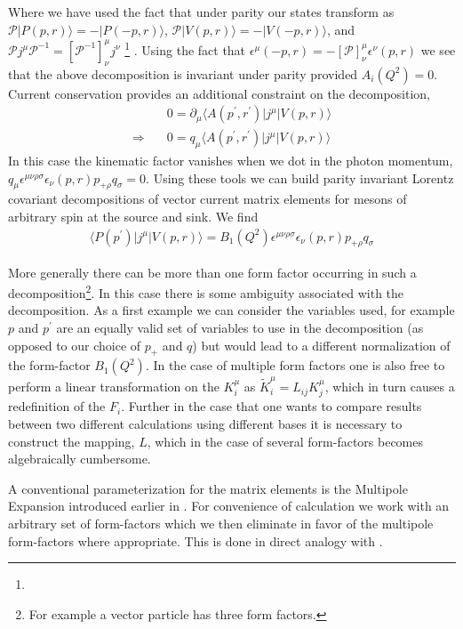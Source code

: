 Where we have used the fact that under parity our states transform as $\mathcal{P} | P(p,r)\rangle = -|P(-p,r)\rangle $, $\mathcal{P} | V(p,r)\rangle = -|V(-p,r)\rangle $, and $\mathcal{P} j^\mu\mathcal{P}^{-1}  = \left[ \mathcal{P}^{-1} \right]^\mu_\nu j^\nu$ \footnote{   } . Using the fact that $\epsilon^\mu(-p,r) = - \left[\mathcal{P}\right]^\mu_\nu \epsilon^\nu(p,r)$ we see that the above decomposition is invariant under parity provided $A_i(Q^2) =0$. 
Current conservation provides an additional constraint on the decomposition, 
\begin{align*} 
&0 = \partial_\mu \langle A(p^\prime,r^\prime) | j^\mu | V(p,r) \rangle \\
\Rightarrow \quad & 0 = q_\mu \langle A(p^\prime,r^\prime) | j^\mu | V(p,r) \rangle
\end{align*}
In this case the kinematic factor vanishes when we dot in the photon momentum, $q_\mu  \epsilon^{\mu\nu\rho\sigma}\epsilon_\nu(p,r)p_{+\rho}q_\sigma = 0$. Using these tools we can build parity invariant Lorentz covariant decompositions of vector current matrix elements for mesons of arbitrary spin at the source and sink. We find 
\begin{align*}
\langle P(p^\prime) | j^\mu | V(p,r) \rangle =B_1(Q^2) \epsilon^{\mu\nu\rho\sigma}\epsilon_\nu(p,r)p_{+\rho}q_\sigma
\end{align*}

More generally there can be more than one form factor occurring in such a decomposition\footnote{For example a vector particle has three form factors.}. In this case there is some ambiguity associated with the decomposition. As a first example we can consider the variables used, for example $p$ and $p^\prime$ are an equally valid set of variables to use in the decomposition (as opposed to our choice of $p_+$ and $q$) but would lead to a different normalization of the form-factor $B_1(Q^2)$. In the case of multiple form factors one is also free to perform a linear transformation on the $K^{\mu}_i$ as $\tilde{K}^\mu_i = L_{ij}K^\mu_j$, which in turn causes a redefinition of the $F_i$. Further in the case that one wants to compare results between two different calculations using different bases it is necessary to construct the mapping, $L$, which in the case of several form-factors becomes algebraically cumbersome.
 
A conventional parameterization for the matrix elements is the Multipole Expansion introduced earlier in . For convenience of calculation we work with an arbitrary set of form-factors which we then eliminate in favor of the multipole form-factors where appropriate. This is done in direct analogy with \cite{Durand:1962zza,Dudek:2009kk}.

